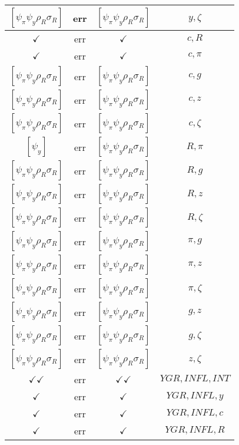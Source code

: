 \documentclass[a4paper,10pt]{article}
\begin{document}
\begin{longtable}{|c|c|c|c|}
\hline
$[\psi_\pi \psi_y \rho_R \sigma_R ]$ & err & $[\psi_\pi \psi_y \rho_R \sigma_R ]$ & ${y},{\zeta}$ \\
\hline
$\checkmark$ & err & $\checkmark$ & ${c},{R}$ \\
\hline
$\checkmark$ & err & $\checkmark$ & ${c},{\pi}$ \\
\hline
$[\psi_\pi \psi_y \rho_R \sigma_R ]$ & err & $[\psi_\pi \psi_y \rho_R \sigma_R ]$ & ${c},{g}$ \\
\hline
$[\psi_\pi \psi_y \rho_R \sigma_R ]$ & err & $[\psi_\pi \psi_y \rho_R \sigma_R ]$ & ${c},{z}$ \\
\hline
$[\psi_\pi \psi_y \rho_R \sigma_R ]$ & err & $[\psi_\pi \psi_y \rho_R \sigma_R ]$ & ${c},{\zeta}$ \\
\hline
$[\psi_y ]$ & err & $[\psi_\pi \psi_y \rho_R \sigma_R ]$ & ${R},{\pi}$ \\
\hline
$[\psi_\pi \psi_y \rho_R \sigma_R ]$ & err & $[\psi_\pi \psi_y \rho_R \sigma_R ]$ & ${R},{g}$ \\
\hline
$[\psi_\pi \psi_y \rho_R \sigma_R ]$ & err & $[\psi_\pi \psi_y \rho_R \sigma_R ]$ & ${R},{z}$ \\
\hline
$[\psi_\pi \psi_y \rho_R \sigma_R ]$ & err & $[\psi_\pi \psi_y \rho_R \sigma_R ]$ & ${R},{\zeta}$ \\
\hline
$[\psi_\pi \psi_y \rho_R \sigma_R ]$ & err & $[\psi_\pi \psi_y \rho_R \sigma_R ]$ & ${\pi},{g}$ \\
\hline
$[\psi_\pi \psi_y \rho_R \sigma_R ]$ & err & $[\psi_\pi \psi_y \rho_R \sigma_R ]$ & ${\pi},{z}$ \\
\hline
$[\psi_\pi \psi_y \rho_R \sigma_R ]$ & err & $[\psi_\pi \psi_y \rho_R \sigma_R ]$ & ${\pi},{\zeta}$ \\
\hline
$[\psi_\pi \psi_y \rho_R \sigma_R ]$ & err & $[\psi_\pi \psi_y \rho_R \sigma_R ]$ & ${g},{z}$ \\
\hline
$[\psi_\pi \psi_y \rho_R \sigma_R ]$ & err & $[\psi_\pi \psi_y \rho_R \sigma_R ]$ & ${g},{\zeta}$ \\
\hline
$[\psi_\pi \psi_y \rho_R \sigma_R ]$ & err & $[\psi_\pi \psi_y \rho_R \sigma_R ]$ & ${z},{\zeta}$ \\
\hline
$\checkmark\checkmark$ & err & $\checkmark\checkmark$ & ${YGR},{INFL},{INT}$ \\
\hline
$\checkmark$ & err & $\checkmark$ & ${YGR},{INFL},{y}$ \\
\hline
$\checkmark$ & err & $\checkmark$ & ${YGR},{INFL},{c}$ \\
\hline
$\checkmark$ & err & $\checkmark$ & ${YGR},{INFL},{R}$ \\

\end{longtable}
\end{document}
